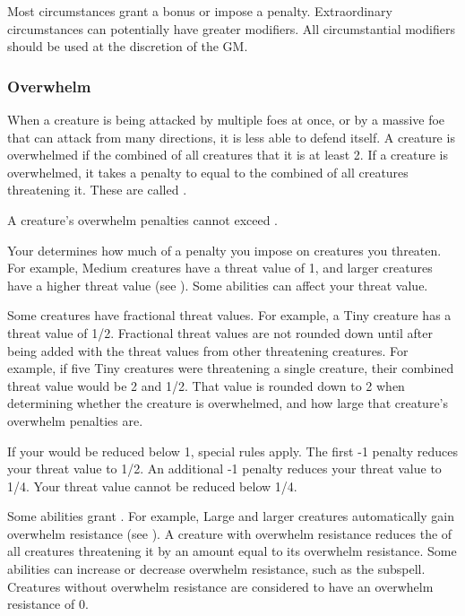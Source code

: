             Most circumstances grant a  bonus or impose a  penalty.
            Extraordinary circumstances can potentially have greater modifiers.
            All circumstantial modifiers should be used at the discretion of the GM.\@

        \subsubsection{Overwhelm}\label{Overwhelm}
            When a creature is being attacked by multiple foes at once, or by a massive foe that can attack from many directions, it is less able to defend itself.
            A creature is overwhelmed if the combined  of all creatures that  it is at least 2.
            If a creature is overwhelmed, it takes a penalty to  equal to the combined  of all creatures threatening it.
            These are called .

            A creature's overwhelm penalties cannot exceed .

            \label{Threat Value} Your  determines how much of a penalty you impose on creatures you threaten.
            For example, Medium creatures have a threat value of 1, and larger creatures have a higher threat value (see ).
            Some abilities can affect your threat value.

            Some creatures have fractional threat values.
            For example, a Tiny creature has a threat value of 1/2.
            Fractional threat values are not rounded down until after being added with the threat values from other threatening creatures.
            For example, if five Tiny creatures were threatening a single creature, their combined threat value would be 2 and 1/2.
            That value is rounded down to 2 when determining whether the creature is overwhelmed, and how large that creature's overwhelm penalties are.

            If your  would be reduced below 1, special rules apply.
            The first -1 penalty reduces your threat value to 1/2.
            An additional -1 penalty reduces your threat value to 1/4.
            Your threat value cannot be reduced below 1/4.

            \label{Overwhelm Resistance} Some abilities grant .
            For example, Large and larger creatures automatically gain overwhelm resistance (see ).
            A creature with overwhelm resistance reduces the  of all creatures threatening it by an amount equal to its overwhelm resistance.
            Some abilities can increase or decrease overwhelm resistance, such as the  subspell.
            Creatures without overwhelm resistance are considered to have an overwhelm resistance of 0.

